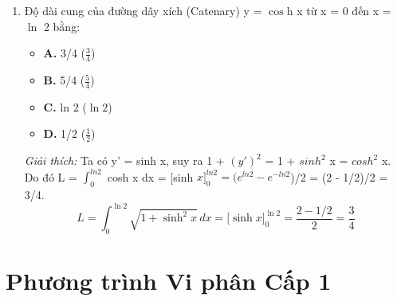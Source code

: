 \documentclass[11pt,a4paper,oneside]{book}
\begin{document}
\begin{enumerate}[label=\textbf{Câu \arabic*:}, leftmargin=2.2em, itemsep=8pt]
  \[ c \int_0^2 (2x - x^2)\,dx = c\left(4 - \frac{8}{3}\right) = \frac{4}{3}c = 1 \implies c = \frac{3}{4} \]
  \item Độ dài cung của đường dây xích (Catenary) y = $\cos$h x từ x = 0 đến x = $\ln$ 2 bằng:
  \begin{itemize}[label={}, leftmargin=1em, itemsep=2pt]
    \item \textbf{A.} 3/4 \quad ($\frac{3}{4}$)
    \item \textbf{B.} 5/4 \quad ($\frac{5}{4}$)
    \item \textbf{C.} ln 2 \quad ($\ln 2$)
    \item \textbf{D.} 1/2 \quad ($\frac{1}{2}$)
  \end{itemize}
  \vspace{2pt}
   \textit{Giải thích:} Ta có y' = sinh x, suy ra 1 + $(y')^2$ = 1 + $sinh^2$ x = $cosh^2$ x. Do đó L = $\int_0^{ln 2}$ cosh x dx = [sinh $x]_0^{ln 2} = (e^{ln 2} - e^{-ln 2}$)/2 = (2 - 1/2)/2 = 3/4.
  \[ L = \int_0^{\ln 2} \sqrt{1 + \sinh^2 x}\,dx = \Big[\sinh x\Big]_0^{\ln 2} = \frac{2 - 1/2}{2} = \frac{3}{4} \]
\end{enumerate}

\chapter{Phương trình Vi phân Cấp 1}
\label{chap:chuong-9}
\end{document}
